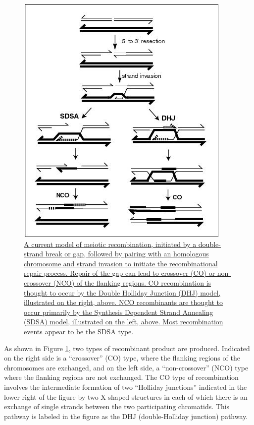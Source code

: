 \begin{figure}

{\centering \includegraphics[width=0.7\linewidth]{./figures/linkage/Homologous_Recombination} 

}

\caption{\href{https://commons.wikimedia.org/wiki/File:Homologous_Recombination.jpg}{A current model of meiotic recombination, initiated by a double-strand break or gap, followed by pairing with an homologous chromosome and strand invasion to initiate the recombinational repair process. Repair of the gap can lead to crossover (CO) or non-crossover (NCO) of the flanking regions. CO recombination is thought to occur by the Double Holliday Junction (DHJ) model, illustrated on the right, above. NCO recombinants are thought to occur primarily by the Synthesis Dependent Strand Annealing (SDSA) model, illustrated on the left, above. Most recombination events appear to be the SDSA type.}}\label{fig:recombination}
\end{figure}

As shown in Figure \ref{fig:recombination}, two types of recombinant product are produced. Indicated on the right side is a ``crossover'' (CO) type, where the flanking regions of the chromosomes are exchanged, and on the left side, a ``non-crossover'' (NCO) type where the flanking regions are not exchanged. The CO type of recombination involves the intermediate formation of two ``Holliday junctions'' indicated in the lower right of the figure by two X shaped structures in each of which there is an exchange of single strands between the two participating chromatids. This pathway is labeled in the figure as the DHJ (double-Holliday junction) pathway.

